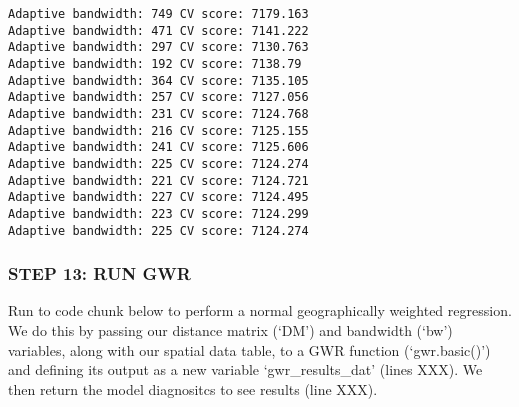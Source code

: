 \documentclass[
  12pt,
]{article}
\begin{document}
\begin{verbatim}
Adaptive bandwidth: 749 CV score: 7179.163 
Adaptive bandwidth: 471 CV score: 7141.222 
Adaptive bandwidth: 297 CV score: 7130.763 
Adaptive bandwidth: 192 CV score: 7138.79 
Adaptive bandwidth: 364 CV score: 7135.105 
Adaptive bandwidth: 257 CV score: 7127.056 
Adaptive bandwidth: 231 CV score: 7124.768 
Adaptive bandwidth: 216 CV score: 7125.155 
Adaptive bandwidth: 241 CV score: 7125.606 
Adaptive bandwidth: 225 CV score: 7124.274 
Adaptive bandwidth: 221 CV score: 7124.721 
Adaptive bandwidth: 227 CV score: 7124.495 
Adaptive bandwidth: 223 CV score: 7124.299 
Adaptive bandwidth: 225 CV score: 7124.274 
\end{verbatim}

\hypertarget{step-13-run-gwr}{%
\subsubsection{STEP 13: RUN GWR}\label{step-13-run-gwr}}

Run to code chunk below to perform a normal geographically weighted
regression. We do this by passing our distance matrix (`DM') and
bandwidth (`bw') variables, along with our spatial data table, to a GWR
function (`gwr.basic()') and defining its output as a new variable
`gwr\_results\_dat' (lines XXX). We then return the model diagnositcs to
see results (line XXX).
\end{document}
